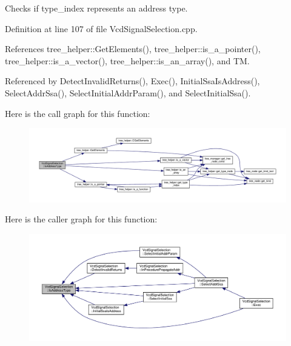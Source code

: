 Checks if type\+\_\+index represents an address type. 



Definition at line 107 of file Vcd\+Signal\+Selection.\+cpp.



References tree\+\_\+helper\+::\+Get\+Elements(), tree\+\_\+helper\+::is\+\_\+a\+\_\+pointer(), tree\+\_\+helper\+::is\+\_\+a\+\_\+vector(), tree\+\_\+helper\+::is\+\_\+an\+\_\+array(), and TM.



Referenced by Detect\+Invalid\+Returns(), Exec(), Initial\+Ssa\+Is\+Address(), Select\+Addr\+Ssa(), Select\+Initial\+Addr\+Param(), and Select\+Initial\+Ssa().

Here is the call graph for this function\+:
\nopagebreak
\begin{figure}[H]
\begin{center}
\leavevmode
\includegraphics[width=350pt]{dd/de4/classVcdSignalSelection_a0f3b879787fa7afb91ef8a7a9b4b52d1_cgraph}
\end{center}
\end{figure}
Here is the caller graph for this function\+:
\nopagebreak
\begin{figure}[H]
\begin{center}
\leavevmode
\includegraphics[width=350pt]{dd/de4/classVcdSignalSelection_a0f3b879787fa7afb91ef8a7a9b4b52d1_icgraph}
\end{center}
\end{figure}
\mbox{\label{classVcdSignalSelection_af1921e71908a17971a4da3ed06f3850b}} 
